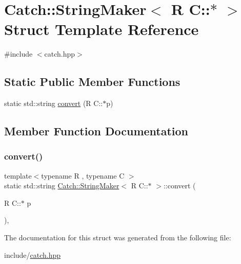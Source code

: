 \hypertarget{structCatch_1_1StringMaker_3_01R_01C_1_1_5_01_4}{}\section{Catch\+:\+:String\+Maker$<$ R C\+:\+:$\ast$ $>$ Struct Template Reference}
\label{structCatch_1_1StringMaker_3_01R_01C_1_1_5_01_4}


{\ttfamily \#include $<$catch.\+hpp$>$}

\subsection*{Static Public Member Functions}
\begin{DoxyCompactItemize}
\item 
static std\+::string \mbox{\hyperlink{structCatch_1_1StringMaker_3_01R_01C_1_1_5_01_4_af69c15e0b406e945777137fe4a333731}{convert}} (R C\+::$\ast$p)
\end{DoxyCompactItemize}


\subsection{Member Function Documentation}
\mbox{\label{structCatch_1_1StringMaker_3_01R_01C_1_1_5_01_4_af69c15e0b406e945777137fe4a333731}} 
\subsubsection{\texorpdfstring{convert()}{convert()}}
{\footnotesize\ttfamily template$<$typename R , typename C $>$ \\
static std\+::string \mbox{\hyperlink{structCatch_1_1StringMaker}{Catch\+::\+String\+Maker}}$<$ R C\+::$\ast$ $>$\+::convert (\begin{DoxyParamCaption}\item[{R C\+::$\ast$}]{p }\end{DoxyParamCaption})\hspace{0.3cm}{\ttfamily [inline]}, {\ttfamily [static]}}



The documentation for this struct was generated from the following file\+:\begin{DoxyCompactItemize}
\item 
include/\mbox{\hyperlink{catch_8hpp}{catch.\+hpp}}\end{DoxyCompactItemize}
